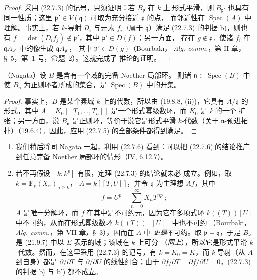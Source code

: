 \begin{proof}
采用 (22.7.3) 的记号，只须证明：若 $B_{\mathfrak p}$ 在 $k$ 上
形式平滑，则 $B_{\mathfrak p'}$ 也具有同一性质；这里
$\mathfrak p'\in V(\mathfrak q)$ 可取为充分接近 $\mathfrak p$ 的点，
而邻近性在 $\operatorname{Spec}(A)$ 中理解。事实上，若 $k$-导射 $D_i$
与元素 $f_i$（属于 $\mathfrak q$）满足 (22.7.3) 的判据 b)，则也有
$f=\det(D_if_j)\notin\mathfrak p'$，其中 $\mathfrak p'\in D(f)$；另一方面，
存在 $g\notin\mathfrak p$，使诸 $f_i$ 在
$\mathfrak qA_{\mathfrak p'}$ 中的像生成 $\mathfrak qA_{\mathfrak p'}$，
其中 $\mathfrak p'\in D(g)$（Bourbaki，
\emph{Alg. comm.}，第 II 章，§~5，第~1 号，命题~2）。这就完成了
推论的证明。
\end{proof}

\begin{corollary}[22.7.6]
\label{0.22.7.6-fr}
\textnormal{（Nagata）}设 $B$ 是含有一个域的完备 Noether 局部环。
则诸 $\mathfrak n\in\operatorname{Spec}(B)$ 中使
$B_{\mathfrak n}$ 为正则环者所成的集合，是
$\operatorname{Spec}(B)$ 中的开集。
\end{corollary}

\begin{proof}
事实上，$B$ 是某个素域 $k$ 上的代数，所以由 (19.8.8, (ii))，它具有
$A/\mathfrak q$ 的形式，其中
$A=K_0[[T_1,\ldots,T_n]]$ 是一个形式幂级数环，而 $K_0$ 是 $k$ 的一个
扩张；另一方面，说 $B_{\mathfrak n}$ 是正则环，等价于说它是形式平滑
$k$-代数（关于 $\mathfrak n$-预进拓扑）（19.6.4）。因此，应用
(22.7.5) 的全部条件都得到满足。
\end{proof}

\begin{remarks}[22.7.7]
\label{0.22.7.7-fr}
\begin{enumerate}
  \item[(i)] 我们稍后将同 Nagata 一起，利用 (22.7.6) 看到：可以把
  (22.7.6) 的结论推广到任意完备 Noether 局部环的情形（IV, 6.12.7）。

  \item[(ii)] 若不再假设 $[k:k^p]$ 有限，定理 (22.7.3) 的结论就未必
  成立。例如，取 $k=\mathbf F_p(X_n)_{n\geqslant0}$，
  $A=k[[T,U]]$，并令 $\mathfrak q$ 为主理想 $Af$，其中
  \[
    f=U^p-\sum_{n=0}^{\infty}X_nT^{np}~;
  \]
  $A$ 是唯一分解环，而 $f$ 在其中是不可约元，因为它在多项式环
  $k((T))[U]$ 中不可约，从而在形式幂级数环 $k((T))[[U]]$ 中也不可约
  （Bourbaki，\emph{Alg. comm.}，第 VII 章，§~3），因而在 $A$ 中
  \emph{更是}不可约。取 $\mathfrak p=\mathfrak q$，于是
  $B_{\mathfrak p}$ 是 (21.9.7) 中以 $E$ 表示的域；该域在 $k$ 上可分
  （\emph{同上}），所以它是形式平滑 $k$-代数。然而，在这里采用
  (22.7.3) 的记号，有 $k=K_0=K$，而 $k$-导射（从 $A$ 到自身）都是
  $\partial/\partial T$ 与 $\partial/\partial U$ 的线性组合；由于
  $\partial f/\partial T=\partial f/\partial U=0$，(22.7.3) 的判据 b)
  与 b') 都不成立。
\end{enumerate}
\end{remarks}

